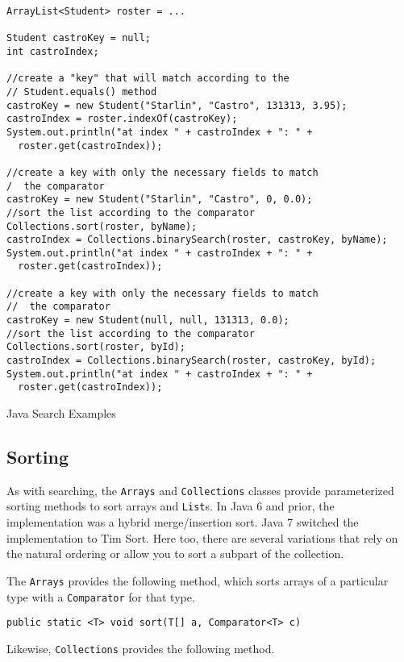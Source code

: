 \begin{listing}[H]
\begin{verbatim}
ArrayList<Student> roster = ...
		
Student castroKey = null;
int castroIndex;
		
//create a "key" that will match according to the 
// Student.equals() method
castroKey = new Student("Starlin", "Castro", 131313, 3.95);
castroIndex = roster.indexOf(castroKey);
System.out.println("at index " + castroIndex + ": " + 
  roster.get(castroIndex));

//create a key with only the necessary fields to match 
/  the comparator
castroKey = new Student("Starlin", "Castro", 0, 0.0);
//sort the list according to the comparator
Collections.sort(roster, byName);
castroIndex = Collections.binarySearch(roster, castroKey, byName);
System.out.println("at index " + castroIndex + ": " + 
  roster.get(castroIndex));

//create a key with only the necessary fields to match 
//  the comparator
castroKey = new Student(null, null, 131313, 0.0);
//sort the list according to the comparator
Collections.sort(roster, byId);
castroIndex = Collections.binarySearch(roster, castroKey, byId);
System.out.println("at index " + castroIndex + ": " + 
  roster.get(castroIndex));
\end{verbatim}
\caption{Java Search Examples}
\label{code:java:searchExamples}
\end{listing}

\subsection{Sorting}

As with searching, the \texttt{Arrays} and 
\texttt{Collections} classes provide parameterized sorting 
methods to sort arrays and \texttt{List}s.  In Java 6 and prior, 
the implementation was a hybrid merge/insertion sort.  Java 7
switched the implementation to Tim Sort.  Here too, there are several 
variations that rely on the natural ordering or allow you to sort a 
subpart of the collection.

The \texttt{Arrays} provides the following method, which sorts 
arrays of a particular type with a \texttt{Comparator} for that type.

\texttt{public static <T> void sort(T[] a, Comparator<T> c)}

Likewise, \texttt{Collections} provides the following method.

